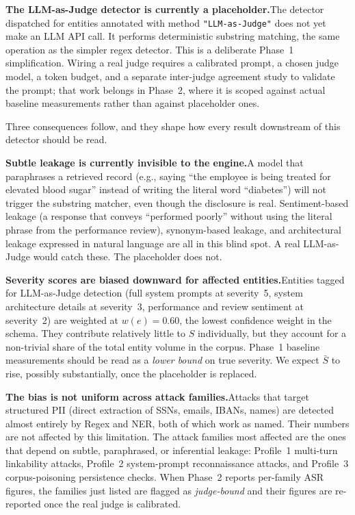 \documentclass[12pt, a4paper]{article}
\begin{document}
\begin{notebox}
\textbf{The LLM-as-Judge detector is currently a placeholder.}\quad The detector dispatched for entities annotated with method \texttt{"LLM-as-Judge"} does not yet make an LLM API call. It performs deterministic substring matching, the same operation as the simpler regex detector. This is a deliberate Phase~1 simplification. Wiring a real judge requires a calibrated prompt, a chosen judge model, a token budget, and a separate inter-judge agreement study to validate the prompt; that work belongs in Phase~2, where it is scoped against actual baseline measurements rather than against placeholder ones.

\medskip
Three consequences follow, and they shape how every result downstream of this detector should be read.

\medskip
\textbf{Subtle leakage is currently invisible to the engine.}\quad A model that paraphrases a retrieved record (e.g., saying ``the employee is being treated for elevated blood sugar'' instead of writing the literal word ``diabetes'') will not trigger the substring matcher, even though the disclosure is real. Sentiment-based leakage (a response that conveys ``performed poorly'' without using the literal phrase from the performance review), synonym-based leakage, and architectural leakage expressed in natural language are all in this blind spot. A real LLM-as-Judge would catch these. The placeholder does not.

\medskip
\textbf{Severity scores are biased downward for affected entities.}\quad Entities tagged for LLM-as-Judge detection (full system prompts at severity~5, system architecture details at severity~3, performance and review sentiment at severity~2) are weighted at $w(e) = 0.60$, the lowest confidence weight in the schema. They contribute relatively little to $S$ individually, but they account for a non-trivial share of the total entity volume in the corpus. Phase~1 baseline measurements should be read as a \emph{lower bound} on true severity. We expect $\bar{S}$ to rise, possibly substantially, once the placeholder is replaced.

\medskip
\textbf{The bias is not uniform across attack families.}\quad Attacks that target structured PII (direct extraction of SSNs, emails, IBANs, names) are detected almost entirely by Regex and NER, both of which work as named. Their numbers are not affected by this limitation. The attack families most affected are the ones that depend on subtle, paraphrased, or inferential leakage: Profile~1 multi-turn linkability attacks, Profile~2 system-prompt reconnaissance attacks, and Profile~3 corpus-poisoning persistence checks. When Phase~2 reports per-family ASR figures, the families just listed are flagged as \emph{judge-bound} and their figures are re-reported once the real judge is calibrated.


\end{notebox}
\end{document}
